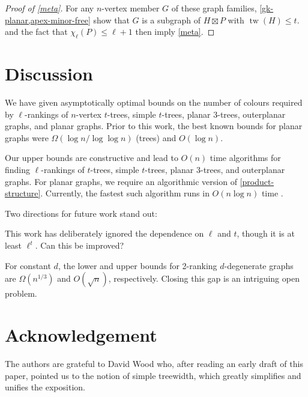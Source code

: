 \documentclass[kpfonts]{patmorin}
\DeclareMathOperator{\tw}{tw}
\newcommand{\lrn}{\chi_{\ell}}
\theoremstyle{named}
\begin{document}
\begin{proof}[Proof of \cref{meta}]
    For any $n$-vertex member $G$ of these graph families, \cref{gk-planar,apex-minor-free} show that $G$ is a subgraph of $H\boxtimes P$ with $\tw(H)\le t$.   and the fact that $\lrn(P)\le \ell+1$ then imply \cref{meta}.
\end{proof}

\section{Discussion}
\label{conclusion}

We have given asymptotically optimal bounds on the number of colours required by $\ell$-rankings of $n$-vertex $t$-trees, simple $t$-trees, planar 3-trees, outerplanar graphs, and planar graphs.  Prior to this work, the best known bounds for planar graphs were $\Omega(\log n/\log\log n)$ (trees) and $O(\log n)$.

Our upper bounds are constructive and lead to $O(n)$ time algorithms for finding $\ell$-rankings of $t$-trees, simple $t$-trees, planar 3-trees, and outerplanar graphs.  For planar graphs, we require an algorithmic version of \cref{product-structure}. Currently, the fastest such algorithm runs in $O(n\log n)$ time \cite{morin:fast}.

Two directions for future work stand out:
\begin{inparaenum}[(i)]
    \item This work has deliberately ignored the dependence on $\ell$ and $t$, though it is at least $\ell^t$.  Can this be improved?
    \item For constant $d$, the lower and upper bounds for 2-ranking $d$-degenerate graphs are $\Omega(n^{1/3})$ and $O(\sqrt{n})$, respectively.  Closing this gap is an intriguing open problem.
\end{inparaenum}

\section*{Acknowledgement}

The authors are grateful to David Wood who, after reading an early draft of this paper, pointed us to the notion of simple treewidth, which greatly simplifies and unifies the exposition.




\end{document}
